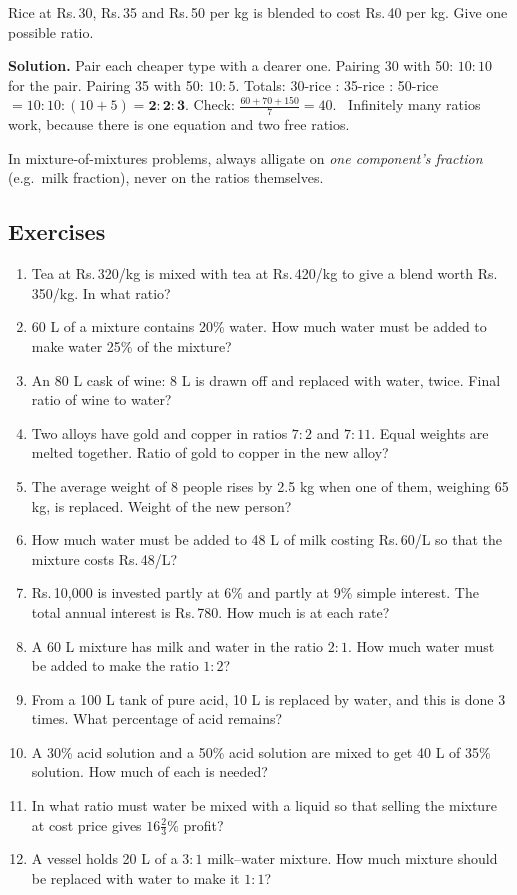 \documentclass[11pt,a4paper,openany]{report}
\newenvironment{exercises}{\subsection*{Exercises \thechapter}\begin{enumerate}[label=\textbf{\thechapter.\arabic*},leftmargin=3.2em]}{\end{enumerate}}
\newcommand{\Rs}{Rs.\,}
\begin{document}
\begin{example}
Rice at \Rs30, \Rs35 and \Rs50 per kg is blended to cost \Rs40 per kg. Give one possible ratio.

\textbf{Solution.} Pair each cheaper type with a dearer one. Pairing 30 with 50: $10:10$ for the pair. Pairing 35 with 50: $10:5$. Totals: 30-rice : 35-rice : 50-rice $=10:10:(10+5)=\mathbf{2:2:3}$. Check: $\frac{60+70+150}{7}=40$. \checkmark\ Infinitely many ratios work, because there is one equation and two free ratios.
\end{example}

\begin{trap}
In mixture-of-mixtures problems, always alligate on \emph{one component's fraction} (e.g.\ milk fraction), never on the ratios themselves.
\end{trap}

\begin{exercises}
\item Tea at \Rs320/kg is mixed with tea at \Rs420/kg to give a blend worth \Rs350/kg. In what ratio?
\item 60 L of a mixture contains 20\% water. How much water must be added to make water 25\% of the mixture?
\item An 80 L cask of wine: 8 L is drawn off and replaced with water, twice. Final ratio of wine to water?
\item Two alloys have gold and copper in ratios $7:2$ and $7:11$. Equal weights are melted together. Ratio of gold to copper in the new alloy?
\item The average weight of 8 people rises by 2.5 kg when one of them, weighing 65 kg, is replaced. Weight of the new person?
\item How much water must be added to 48 L of milk costing \Rs60/L so that the mixture costs \Rs48/L?
\item \Rs10,000 is invested partly at 6\% and partly at 9\% simple interest. The total annual interest is \Rs780. How much is at each rate?
\item A 60 L mixture has milk and water in the ratio $2:1$. How much water must be added to make the ratio $1:2$?
\item From a 100 L tank of pure acid, 10 L is replaced by water, and this is done 3 times. What percentage of acid remains?
\item A 30\% acid solution and a 50\% acid solution are mixed to get 40 L of 35\% solution. How much of each is needed?
\item In what ratio must water be mixed with a liquid so that selling the mixture at cost price gives $16\frac23\%$ profit?
\item A vessel holds 20 L of a $3:1$ milk--water mixture. How much mixture should be replaced with water to make it $1:1$?
\end{exercises}
\end{document}
